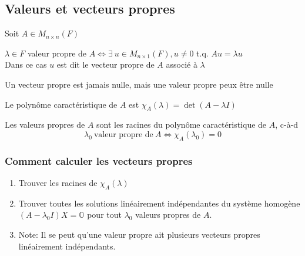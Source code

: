 
\subsection{Valeurs et vecteurs propres}
Soit $A \in M_{n \times n}(F)$
\begin{definition}
    $\lambda \in F$ valeur propre de $A \iff \exists \ u \in M_{n \times 1}(F), u \neq 0$ t.q. $Au = \lambda u$ \\
    Dans ce cas $u$ est dit le vecteur propre de $A$ associé à $\lambda$
\end{definition}
\begin{remark}
    Un vecteur propre est jamais nulle, mais une valeur propre peux être nulle
\end{remark}
\begin{definition}
    Le polynôme caractéristique de $A$ est $\chi_A(\lambda) = \det(A - \lambda I)$
\end{definition}
\begin{theorem}
    Les valeurs propres de $A$ sont les racines du polynôme caractéristique de $A$, c-à-d
    \[
        \lambda_0 \ \text{valeur propre de} \ A \iff \chi_A(\lambda_0) = 0
    \]
\end{theorem}
\subsubsection{Comment calculer les vecteurs propres}
\begin{enumerate}
    \item Trouver les racines de $\chi_A(\lambda)$
    \item Trouver toutes les solutions linéairement indépendantes du système homogène $(A - \lambda_0 I)X = \mathbb{O}$
          pour tout $\lambda_0$ valeurs propres de $A$.
    \item[] Note: Il se peut qu'une valeur propre ait plusieurs vecteurs propres linéairement indépendants.
\end{enumerate}
